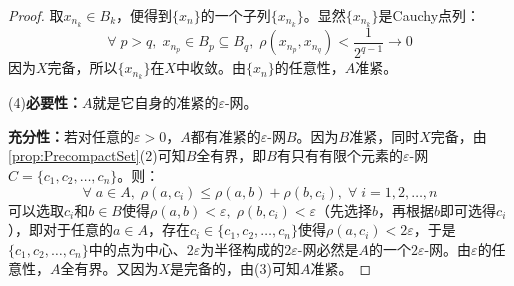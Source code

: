 \begin{proof}
	取$x_{n_k}\in B_k$，便得到$\{x_n\}$的一个子列$\{x_{n_k}\}$。显然$\{x_{n_k}\}$是Cauchy点列：
	\begin{equation*}
		\forall\;p>q,\;x_{n_p}\in B_p\subseteq B_q,\;\rho(x_{n_p},x_{n_q})<\frac{1}{2^{q-1}}\to0
	\end{equation*}	
	因为$X$完备，所以$\{x_{n_k}\}$在$X$中收敛。由$\{x_n\}$的任意性，$A$准紧。\par
	(4)\textbf{必要性：}$A$就是它自身的准紧的$\varepsilon$-网。\par
	\textbf{充分性：}若对任意的$\varepsilon>0$，$A$都有准紧的$\varepsilon$-网$B$。因为$B$准紧，同时$X$完备，由\cref{prop:PrecompactSet}(2)可知$B$全有界，即$B$有只有有限个元素的$\varepsilon$-网$C=\{c_1,c_2,\dots,c_n\}$。则：
	\begin{equation*}
		\forall\;a\in A,\;\rho(a,c_i)\leqslant\rho(a,b)+\rho(b,c_i),\;\forall\;i=1,2,\dots,n
	\end{equation*}
	可以选取$c_i$和$b\in B$使得$\rho(a,b)<\varepsilon,\;\rho(b,c_i)<\varepsilon$（先选择$b$，再根据$b$即可选得$c_i$），即对于任意的$a\in A$，存在$c_i\in\{c_1,c_2,\dots,c_n\}$使得$\rho(a,c_i)<2\varepsilon$，于是$\{c_1,c_2,\dots,c_n\}$中的点为中心、$2\varepsilon$为半径构成的$2\varepsilon$-网必然是$A$的一个$2\varepsilon$-网。由$\varepsilon$的任意性，$A$全有界。又因为$X$是完备的，由(3)可知$A$准紧。
\end{proof}

